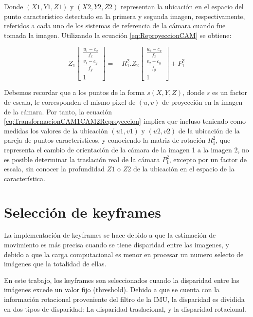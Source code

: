 Donde $(X1, Y1, Z1)$ y $(X2, Y2, Z2)$ representan la ubicación en el espacio del punto característico detectado en la primera y segunda imagen, respectivamente, referidos a cada uno de los sistemas de referencia de la cámara cuando fue tomada la imagen. Utilizando la ecuación \ref{eq:ReproyeccionCAM} se obtiene:


\begin{equation}
{ Z }_{ 1 }\left[ \begin{matrix} \frac { u_{ 1 }-{ c }_{ x } }{ { f }_{ x } }  \\ \frac { { v }_{ 1 }-{ c }_{ y } }{ { f }_{ y } }  \\ 1 \end{matrix} \right] =\quad { R }_{ 1 }^{ 2 }.{ Z }_{ 2 }\left[ \begin{matrix} \frac { u_{ 2 }-{ c }_{ x } }{ { f }_{ x } }  \\ \frac { { v }_{ 2 }-{ c }_{ y } }{ { f }_{ y } }  \\ 1 \end{matrix} \right] +{ P }_{ 1 }^{ 2 }
\label{eq:TransformacionCAM1CAM2Reproyeccion} 
\end{equation}

Debemos recordar que a los puntos de la forma $s (X, Y, Z)$, donde $s$ es un factor de escala, le corresponden el mismo pixel de $(u,v)$ de proyección en la imagen de la cámara. Por tanto, la ecuación \ref{eq:TransformacionCAM1CAM2Reproyeccion} implica que incluso teniendo como medidas los valores de la ubicación  $(u1,v1)$ y $(u2,v2)$ de la ubicación de la pareja de puntos característicos, y conociendo la matriz de rotación ${ R }_{ 1 }^{ 2 }$, que representa el cambio de orientación de la cámara de la imagen 1 a la imagen 2, no es posible determinar la traslación real de la cámara ${ P }_{ 1 }^{ 2 }$, excepto por un factor de escala, sin conocer la profundidad $Z1$ o $Z2$ de la ubicación en el espacio de la característica.


\section{Selección de keyframes}

La implementación de keyframes se hace debido a que la estimación de movimiento es más precisa cuando se tiene disparidad entre las imagenes, y debido a que la carga computacional es menor en procesar un numero selecto de imágenes que la totalidad de ellas.

En este trabajo, los keyframes son seleccionados cuando la disparidad entre las imágenes excede un valor fijo (threshold). Debido a que se cuenta con la información rotacional proveniente del filtro de la IMU, la disparidad es dividida en dos tipos de disparidad: La disparidad traslacional, y la disparidad rotacional.


